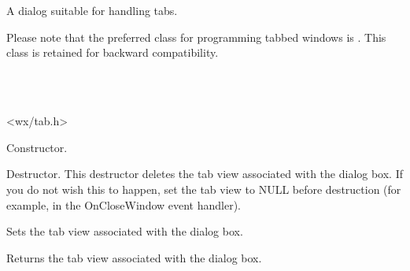 \section{}\label{wxtabbeddialog}

A dialog suitable for handling tabs.

Please note that the preferred class for programming tabbed windows is .
This class is retained for backward compatibility.


\\
\\


<wx/tab.h>






Constructor.



Destructor. This destructor deletes the tab view associated with the dialog box.
If you do not wish this to happen, set the tab view to NULL before destruction (for example,
in the OnCloseWindow event handler).



Sets the tab view associated with the dialog box.



Returns the tab view associated with the dialog box.

\section{}\label{wxtabbedpanel}

